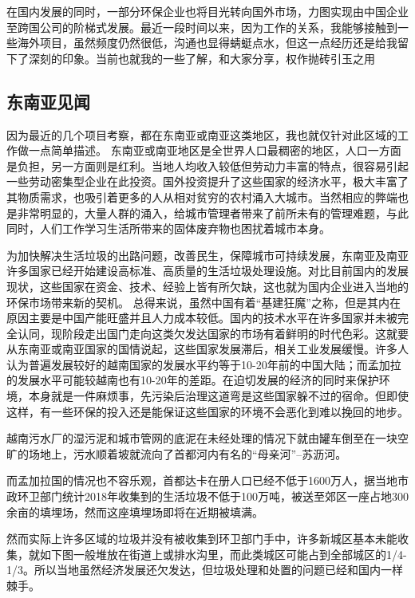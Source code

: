 \documentclass[
]{book}
\begin{document}
在国内发展的同时，一部分环保企业也将目光转向国外市场，力图实现由中国企业至跨国公司的阶梯式发展。最近一段时间以来，因为工作的关系，我能够接触到一些海外项目，虽然频度仍然很低，沟通也显得蜻蜓点水，但这一点经历还是给我留下了深刻的印象。当前也就我的一些了解，和大家分享，权作抛砖引玉之用

\hypertarget{ux4e1cux5357ux4e9aux89c1ux95fb}{%
\subsection{东南亚见闻}\label{ux4e1cux5357ux4e9aux89c1ux95fb}}

因为最近的几个项目考察，都在东南亚或南亚这类地区，我也就仅针对此区域的工作做一点简单描述。
东南亚或南亚地区是全世界人口最稠密的地区，人口一方面是负担，另一方面则是红利。当地人均收入较低但劳动力丰富的特点，很容易引起一些劳动密集型企业在此投资。国外投资提升了这些国家的经济水平，极大丰富了其物质需求，也吸引着更多的人从相对贫穷的农村涌入大城市。当然相应的弊端也是非常明显的，大量人群的涌入，给城市管理者带来了前所未有的管理难题，与此同时，人们工作学习生活所带来的固体废弃物也困扰着城市本身。

为加快解决生活垃圾的出路问题，改善民生，保障城市可持续发展，东南亚及南亚许多国家已经开始建设高标准、高质量的生活垃圾处理设施。对比目前国内的发展现状，这些国家在资金、技术、经验上皆有所欠缺，这也就为国内企业进入当地的环保市场带来新的契机。
总得来说，虽然中国有着``基建狂魔''之称，但是其内在原因主要是中国产能旺盛并且人力成本较低。国内的技术水平在许多国家并未被完全认同，现阶段走出国门走向这类欠发达国家的市场有着鲜明的时代色彩。这就要从东南亚或南亚国家的国情说起，这些国家发展滞后，相关工业发展缓慢。许多人认为普遍发展较好的越南国家的发展水平约等于10-20年前的中国大陆；而孟加拉的发展水平可能较越南也有10-20年的差距。在迫切发展的经济的同时来保护环境，本身就是一件麻烦事，先污染后治理这道弯是这些国家躲不过的宿命。但即使这样，有一些环保的投入还是能保证这些国家的环境不会恶化到难以挽回的地步。

越南污水厂的湿污泥和城市管网的底泥在未经处理的情况下就由罐车倒至在一块空旷的场地上，污水顺着坡就流向了首都河内有名的``母亲河''--苏沥河。

而孟加拉国的情况也不容乐观，首都达卡在册人口已经不低于1600万人，据当地市政环卫部门统计2018年收集到的生活垃圾不低于100万吨，被送至郊区一座占地300余亩的填埋场，然而这座填埋场即将在近期被填满。

然而实际上许多区域的垃圾并没有被收集到环卫部门手中，许多新城区基本未能收集，就如下图一般堆放在街道上或排水沟里，而此类城区可能占到全部城区的1/4-1/3。所以当地虽然经济发展还欠发达，但垃圾处理和处置的问题已经和国内一样棘手。
\end{document}
